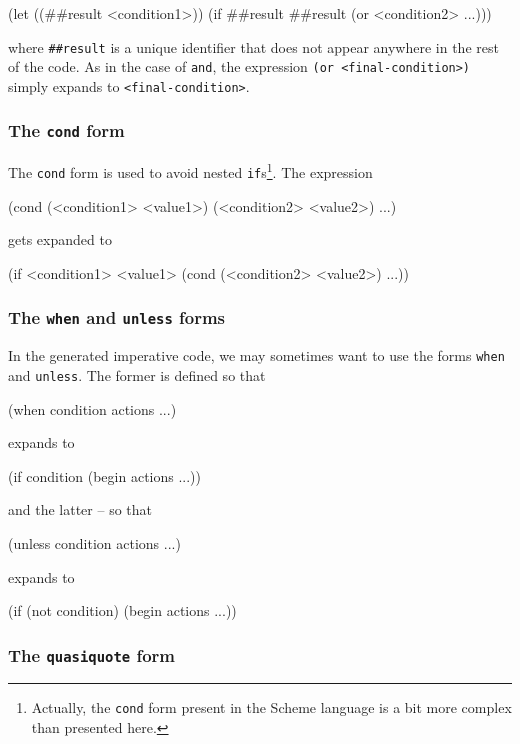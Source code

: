 \begin{Snippet}
(let ((##result <condition1>))
  (if ##result ##result (or <condition2> ...)))
\end{Snippet}

where \texttt{\#\#result} is a unique identifier that does not appear
anywhere in the rest of the code. As in the case of \texttt{and},
the expression \texttt{(or <final-condition>)} simply expands to
\texttt{<final-condition>}.

\subsubsection{The \texttt{cond} form}

The \texttt{cond} form is used to avoid nested \texttt{if}s\footnote{Actually,
  the \texttt{cond} form present in the Scheme language is a bit more complex
  than presented here.}.
The expression
\begin{Snippet}
(cond (<condition1>
       <value1>)
      (<condition2>
       <value2>)
       ...)
\end{Snippet}
gets expanded to
\begin{Snippet}
(if <condition1>
    <value1>
    (cond (<condition2>
           <value2>)
          ...))
\end{Snippet}

\subsubsection{The \texttt{when} and \texttt{unless} forms}

In the generated imperative code, we may sometimes want to use
the forms \texttt{when} and \texttt{unless}. The former is
defined so that
\begin{Snippet}
  (when condition actions ...)
\end{Snippet}
expands to
\begin{Snippet}
  (if condition (begin actions ...))
\end{Snippet}
and the latter -- so that
\begin{Snippet}
  (unless condition actions ...)
\end{Snippet}
expands to
\begin{Snippet}
  (if (not condition) (begin actions ...))
\end{Snippet}

\subsubsection{The \texttt{quasiquote} form}

